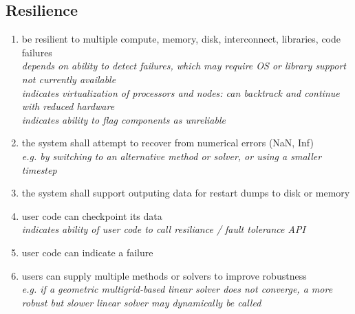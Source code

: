 \documentclass{article}
\begin{document}

\subsection{Resilience}

\begin{enumerate}
    \item be resilient to multiple compute, memory, disk, interconnect, libraries, code failures
      \\ \textit{depends on ability to detect failures, which may require OS or
      library support not currently available }
      \\ \textit{indicates virtualization of processors and nodes: can backtrack
          and continue with reduced hardware }
      \\ \textit{indicates ability to flag components as unreliable }
    \item the system shall attempt to recover from numerical errors (NaN, Inf)
      \\ \textit{e.g. by switching to an alternative method or solver, or using a smaller timestep}
    \item the system shall support outputing data for restart dumps to disk or memory
    \item user code can checkpoint its data
      \\ \textit{indicates ability of user code to call resiliance / fault tolerance API }
    \item user code can indicate a failure
    \item users can supply multiple methods or solvers to improve robustness
      \\ \textit{e.g. if a geometric multigrid-based linear solver does not converge, a more robust but slower linear solver may dynamically be called }
\end{enumerate}
\end{document}
